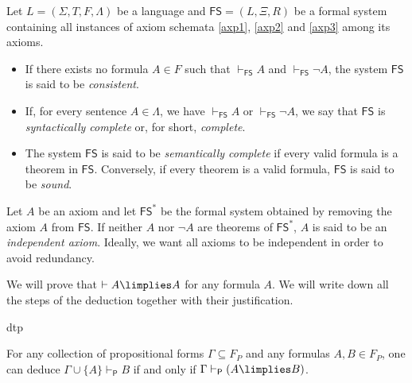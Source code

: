 \begin{definition}
Let $L = (\Sigma,T,F, \Lambda)$ be a language and $\mathsf{FS} = (L,\Xi,R)$ be a formal system containing all instances of axiom schemata \ref{axp1}, \ref{axp2} and \ref{axp3} among its axioms.
\begin{itemize}
\item If there exists no formula $A \in F$ such that $\vdash_\mathsf{FS} A $ and $\vdash_\mathsf{FS} \lnot A$, the system $\mathsf{FS}$ is said to be \emph{consistent}.
\item If, for every sentence $A\in \Lambda$, we have $\vdash_\mathsf{FS} A$ or $\vdash_\mathsf{FS} \lnot A$, we say that $\mathsf{FS}$ is \emph{syntactically complete} or, for short, \emph{complete}.
\item The system $\mathsf{FS}$ is said to be \emph{semantically complete} if every valid formula is a theorem in $\mathsf{FS}$. Conversely, if every theorem is a valid formula, $\mathsf{FS}$ is said to be \emph{sound}.
\end{itemize}
Let $A$ be an axiom and let $\mathsf{FS}^*$ be the formal system obtained by removing the axiom $A$ from $\mathsf{FS}$. If neither $A$ nor $\lnot A$ are theorems of $\mathsf{FS}^*$, $A$ is said to be an \emph{independent axiom}. Ideally, we want all axioms to be independent in order to avoid redundancy.
\end{definition}


\begin{example} \label{dedaa}
We will prove that $\vdash A \limplies A$ for any formula $A$. We will write down all the steps of the deduction together with their justification.

\begin{deduction}{dtp}
\end{deduction}
\end{example}


\begin{theorem}
\label{dedthmprop}
For any collection of propositional forms $\Gamma\subseteq F_P$ and any formulas $A,B\in F_P$, one can deduce $\Gamma\cup\{A\}\vdash_{\mathsf{P}} B$ if and only if $\Gamma \vdash_\mathsf{P} (A\limplies B)$. 
\label{}
\end{theorem}


